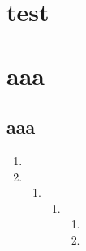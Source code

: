 \documentclass{ctexart}
\begin{document}
\chapter{test}
\chapter{aaa}
\section{aaa}
\begin{enumerate}
	\item
	\item
	      \begin{enumerate}
		      \item
		            \begin{enumerate}
			            \item
			                  \begin{enumerate}
				                  \item
				                  \item
			                  \end{enumerate}
		            \end{enumerate}
	      \end{enumerate}
\end{enumerate}
\end{document}
